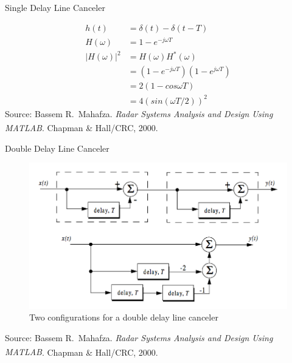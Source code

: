 \documentclass[mathserif]{beamer}
\begin{document}
    \begin{frame}{Single Delay Line Canceler}
      \begin{minipage}[t][0.8\textheight][t]{\textwidth}
   	\begin{align}
    	 h(t) & = \delta(t) - \delta(t-T) \nonumber \\
    	 H(\omega) & = 1 - e^{-j\omega T} \nonumber \\
    	 |H(\omega)|^2 & = H(\omega)H^*(\omega) \nonumber \\
    	 & = (1 - e^{-j\omega T})(1 - e^{j\omega T}) \nonumber \\
    	 & = 2(1-cos\omega T) \nonumber \\
    	 & = 4(sin(\omega T/2))^2 \nonumber
    	\end{align}
	\vfill
   	\tiny{Source: Bassem R.~Mahafza. \emph{Radar Systems Analysis and Design Using MATLAB\textsuperscript{\textregistered}}. Chapman \& Hall/CRC, 2000.}
      \end{minipage}
    \end{frame}
    
    
    \begin{frame}{Double Delay Line Canceler}
      \begin{minipage}[t][0.8\textheight][t]{\textwidth}
	\begin{figure}[h]
		\centering
		\includegraphics[width=0.8\linewidth]{doubleDLC} 
		\caption{Two configurations for a double delay line canceler}
	\end{figure}
	\vfill
    	\tiny{Source: Bassem R.~Mahafza. \emph{Radar Systems Analysis and Design Using MATLAB\textsuperscript{\textregistered}}. Chapman \& Hall/CRC, 2000.}
      \end{minipage}
    \end{frame}
    
\end{document}
